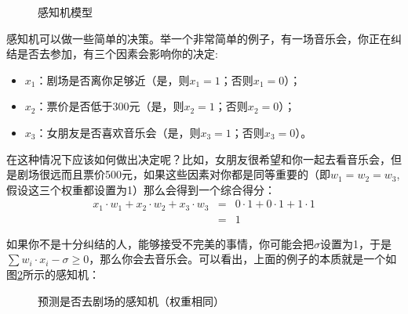 \begin{figure}[htp]
\centering

\caption{感知机模型}
\label{fig:9-5}
\end{figure}

\parinterval 感知机可以做一些简单的决策。举一个非常简单的例子，有一场音乐会，你正在纠结是否去参加，有三个因素会影响你的决定:

\begin{itemize}
\vspace{0.5em}
\item $ x_1 $：剧场是否离你足够近（是，则$ x_1=1 $；否则$ x_1=0 $）；
\vspace{0.5em}
\item $ x_2 $：票价是否低于300元（是，则$ x_2=1 $；否则$ x_2=0 $）；
\vspace{0.5em}
\item $ x_3 $：女朋友是否喜欢音乐会（是，则$ x_3=1 $；否则$ x_3=0 $）。
\vspace{0.5em}
\end{itemize}

\parinterval 在这种情况下应该如何做出决定呢？比如，女朋友很希望和你一起去看音乐会，但是剧场很远而且票价500元，如果这些因素对你都是同等重要的（即$ w_1=w_2=w_3 $,假设这三个权重都设置为1）那么会得到一个综合得分：
\begin{eqnarray}
x_1\cdot w_1+x_2\cdot w_2+x_3\cdot w_3 & = & 0\cdot 1+0\cdot 1+1\cdot 1 \nonumber \\
                                                                     & = & 1
\label{eq:9-20}
\end{eqnarray}

\parinterval 如果你不是十分纠结的人，能够接受不完美的事情，你可能会把$ \sigma $设置为1，于是$ \sum{w_i\cdot x_i}-\sigma \ge 0 $，那么你会去音乐会。可以看出，上面的例子的本质就是一个如图\ref{fig:9-6}所示的感知机：

\begin{figure}[htp]
\centering

\caption{预测是否去剧场的感知机（权重相同）}
\label{fig:9-6}
\end{figure}


